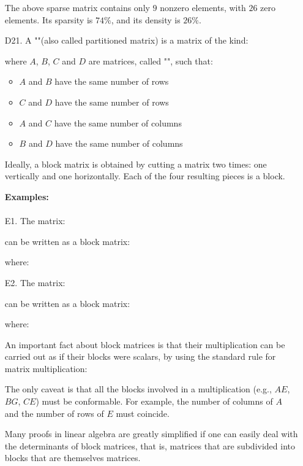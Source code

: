 \begin{enumerate}
		The above sparse matrix contains only $9$ nonzero elements, with $26$ zero elements. Its sparsity is $74\%$, and its density is $26\%$.
		
		\item[D21.] A ""(also called partitioned matrix) is a matrix of the kind:
		
		where $A$, $B$, $C$ and $D$ are matrices, called "", such that:
		\begin{itemize}
			\item $A$ and $B$ have the same number of rows
		
			\item $C$ and $D$ have the same number of rows
		
			\item $A$ and $C$ have the same number of columns
		
			\item $B$ and $D$ have the same number of columns
		\end{itemize}
		Ideally, a block matrix is obtained by cutting a matrix two times: one vertically and one horizontally. Each of the four resulting pieces is a block.
		
		\begin{tcolorbox}[colframe=black,colback=white,sharp corners]
		\textbf{{\Large {}}Examples:}\\\\
		E1. The matrix:
		
		can be written as a block matrix:
		
		where:
		
		E2. The matrix:
		
		can be written as a block matrix:
		
		where:
		
		\end{tcolorbox}
		An important fact about block matrices is that their multiplication can be carried out as if their blocks were scalars, by using the standard rule for matrix multiplication:
		
		The only caveat is that all the blocks involved in a multiplication (e.g., $AE$, $BG$, $CE$) must be conformable. For example, the number of columns of $A$ and the number of rows of $E$ must coincide.
		
		Many proofs in linear algebra are greatly simplified if one can easily deal with the determinants of block matrices, that is, matrices that are subdivided into blocks that are themselves matrices.
	\end{enumerate}
	
